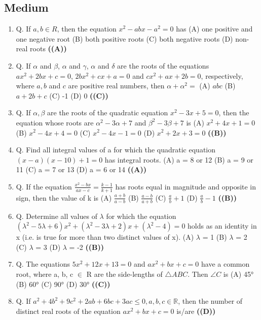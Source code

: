 \documentclass{article}
\begin{document}
\subsection{Medium}
\begin{enumerate}
\item Q. If $a, b \in R$, then the equation $x^2 - abx - a^2 = 0$ has
(A) one positive and one negative root
(B) both positive roots
(C) both negative roots
(D) non-real roots \hfill \textbf{((A))}
\item Q. If $\alpha$ and $\beta$, $\alpha$ and $\gamma$, $\alpha$ and $\delta$ are the roots of the equations $ax^2+2bx+c = 0$, $2bx^2+cx+a = 0$ and $cx^2 + ax + 2b = 0$, respectively, where $a, b$ and $c$ are positive real numbers, then $\alpha+\alpha^2 =$
(A) $abc$
(B) $a + 2b + c$
(C) -1
(D) 0 \hfill \textbf{((C))}
\item Q. If $\alpha, \beta$ are the roots of the quadratic equation $x^2 - 3x + 5 = 0$, then the equation whose roots are $\alpha^2 - 3\alpha + 7$ and $\beta^2 - 3\beta + 7$ is (A) $x^2 + 4x + 1 = 0$ (B) $x^2 - 4x + 4 = 0$ (C) $x^2 - 4x - 1 = 0$ (D) $x^2 + 2x + 3 = 0$ \hfill \textbf{((B))}
\item Q. Find all integral values of a for which the quadratic equation $(x - a) (x - 10) + 1 = 0$ has integral roots. (A) a = 8 or 12 (B) a = 9 or 11 (C) a = 7 or 13 (D) a = 6 or 14 \hfill \textbf{((A))}
\item Q. If the equation $\frac{x^2 - bx}{ax - c} = \frac{k-1}{k+1}$ has roots equal in magnitude and opposite in sign, then the value of k is (A) $\frac{a+b}{a-b}$ (B) $\frac{a-b}{a+b}$ (C) $\frac{a}{b}+1$ (D) $\frac{a}{b}-1$ \hfill \textbf{((B))}
\item Q. Determine all values of $\lambda$ for which the equation $(\lambda^2 - 5\lambda + 6) x^2 + (\lambda^2 - 3\lambda + 2) x + (\lambda^2 - 4) = 0$ holds as an identity in x (i.e. is true for more than two distinct values of x). (A) $\lambda$ = 1 (B) $\lambda$ = 2 (C) $\lambda$ = 3 (D) $\lambda$ = -2 \hfill \textbf{((B))}
\item Q. The equations $5x^2 + 12x + 13 = 0$ and $ax^2 + bx + c = 0$ have a common root, where a, b, c $\in$ R are the side-lengths of $\triangle ABC$. Then $\angle C$ is (A) 45° (B) 60° (C) 90° (D) 30° \hfill \textbf{((C))}
\item Q. If $a^2 + 4b^2 + 9c^2 + 2ab + 6bc + 3ac \leq 0, a, b, c \in \mathbb{R}$, then the number of distinct real roots of the equation $ax^2 + bx + c = 0$ is/are \hfill \textbf{((D))}
\end{enumerate}
\end{document}
